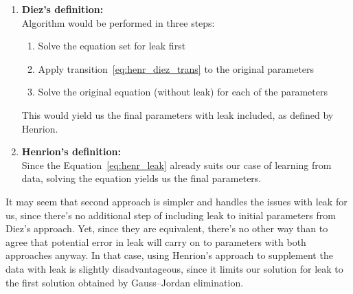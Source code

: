 \begin{enumerate}
\item \textbf{Diez's definition:}\hfill\\ 
Algorithm would be performed in three steps:
\begin{enumerate}
    \item Solve the equation set for leak first
    \item Apply transition~\ref{eq:henr_diez_trans} to the original parameters
    \item Solve the original equation (without leak) for each of the parameters
\end{enumerate}
This would yield us the final parameters with leak included, as defined by Henrion.

\item \textbf{Henrion's definition:}\hfill\\
    Since the Equation~\ref{eq:henr_leak} already suits our case of learning from data, solving the equation yields us the final parameters.
\end{enumerate}

It may seem that second approach is simpler and handles the issues with leak for us, since there's no additional step of including leak to initial parameters from Diez's approach.
Yet, since they are equivalent, there's no other way than to agree that potential error in leak will carry on to parameters with both approaches anyway.
In that case, using Henrion's approach to supplement the data with leak is slightly disadvantageous, since it limits our solution for leak to the first solution obtained by Gauss--Jordan elimination.
